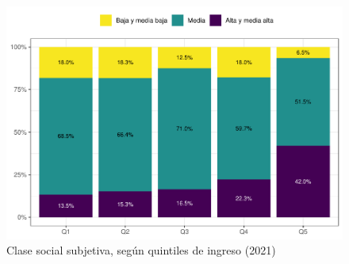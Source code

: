 \documentclass[
  12pt,
]{book}
\begin{document}
\begin{figure}

{\centering \includegraphics{reporte-elsoc_files/figure-latex/ess-quintil-1} 

}

\caption{Clase social subjetiva, según quintiles de ingreso (2021)}\label{fig:ess-quintil}
\end{figure}
\end{document}
